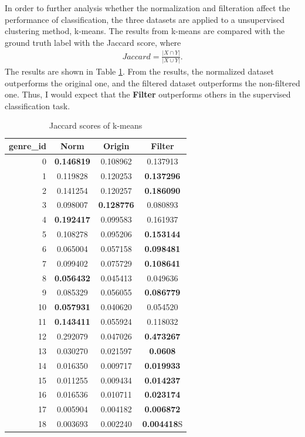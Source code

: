 \documentclass[sigconf ,nonacm]{acmart}
\begin{document}
In order to further analysis whether the normalization and filteration affect the performance of classification, the three datasets are applied to a unsupervised clustering method, k-means. The results from k-means are compared with the ground truth label with the Jaccard score, where
\begin{align*}
Jaccard = \frac{|X \cap Y|}{|X \cup Y|}.
\end{align*}
The results are shown in Table \ref{tabel:kmean}. From the results, the normalized dataset outperforms the original one, and the filtered dataset outperforms the non-filtered one. Thus, I would expect that the \textbf{Filter} outperforms others in the supervised classification task.

\begin{table}[]
\begin{tabular}{r|c|c|c}
 genre\_id & \textbf{Norm} &\textbf{Origin}&\textbf{Filter}\\ \hline
 0 &\textbf{0.146819}&0.108962  &0.137913  \\
 1 &0.119828  &0.120253  &\textbf{0.137296}\\
 2 &0.141254  &0.120257  &\textbf{0.186090}\\
 3 &0.098007  &\textbf{0.128776}&0.080893  \\
 4 &\textbf{0.192417}&0.099583  &0.161937  \\
 5 &0.108278  &0.095206  &\textbf{0.153144}\\
 6 &0.065004  &0.057158  &\textbf{0.098481}\\
 7 &0.099402  &0.075729  &\textbf{0.108641}\\
 8 &\textbf{0.056432}&0.045413  &0.049636  \\
 9 &0.085329  &0.056055  &\textbf{0.086779}\\
10 &\textbf{0.057931}&0.040620  &0.054520  \\
11 &\textbf{0.143411}&0.055924  &0.118032  \\
12 &0.292079  &0.047026  &\textbf{0.473267}\\
13 &0.030270  &0.021597  &\textbf{0.0608}  \\
14 &0.016350  &0.009717  &\textbf{0.019933}\\
15 &0.011255  &0.009434  &\textbf{0.014237}\\
16 &0.016536  &0.010711  &\textbf{0.023174}\\
17 &0.005904  &0.004182  &\textbf{0.006872}\\
18 &0.003693  &0.002240  &\textbf{0.004418}S
\end{tabular}
\caption{Jaccard scores of k-means}
\label{tabel:kmean}
\end{table}
\end{document}
